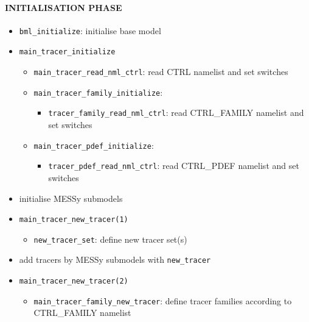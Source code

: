 \documentclass[twoside]{article}
\begin{document}
\paragraph{INITIALISATION PHASE}
\begin{itemize}

  \item {\tt bml\_initialize}: initialise base model

  \item {\tt main\_tracer\_initialize}
        \begin{itemize}
         \item {\tt main\_tracer\_read\_nml\_ctrl}: 
               read CTRL namelist and set switches
         \item {\tt main\_tracer\_family\_initialize}:
               \begin{itemize}
                \item {\tt tracer\_family\_read\_nml\_ctrl}:
                      read CTRL\_FAMILY namelist and set switches
               \end{itemize}
         \item {\tt main\_tracer\_pdef\_initialize}:
               \begin{itemize}
                \item {\tt tracer\_pdef\_read\_nml\_ctrl}:
                      read CTRL\_PDEF namelist and set switches
               \end{itemize}
        \end{itemize}

  \item initialise MESSy submodels

  \item {\tt main\_tracer\_new\_tracer(1)}
        \begin{itemize}
          \item {\tt new\_tracer\_set}: define new tracer set(s)
        \end{itemize}

  \item add tracers by MESSy submodels with {\tt new\_tracer}

  \item {\tt main\_tracer\_new\_tracer(2)}
        \begin{itemize}
          \item {\tt main\_tracer\_family\_new\_tracer}:
                define tracer families
                according to CTRL\_FAMILY namelist
        \end{itemize}


\end{itemize}
\end{document}

